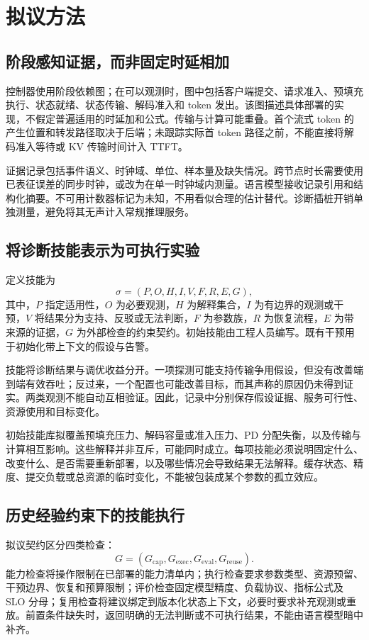 \documentclass[UTF8,11pt,a4paper,fontset=windows]{ctexart}
\begin{document}
\section{拟议方法}
\subsection{阶段感知证据，而非固定时延相加}
控制器使用阶段依赖图；在可以观测时，图中包括客户端提交、请求准入、预填充执行、状态就绪、状态传输、解码准入和 token 发出。该图描述具体部署的实现，不假定普遍适用的时延加和公式。传输与计算可能重叠。首个流式 token 的产生位置和转发路径取决于后端；未跟踪实际首 token 路径之前，不能直接将解码准入等待或 KV 传输时间计入 TTFT。

证据记录包括事件语义、时钟域、单位、样本量及缺失情况。跨节点时长需要使用已表征误差的同步时钟，或改为在单一时钟域内测量。语言模型接收记录引用和结构化摘要。不可用计数器标记为未知，不用看似合理的估计替代。诊断插桩开销单独测量，避免将其无声计入常规推理服务。

\subsection{将诊断技能表示为可执行实验}
定义技能为
\begin{equation}
 \sigma=(P,O,H,I,V,F,R,E,G),
\end{equation}
其中，$P$ 指定适用性，$O$ 为必要观测，$H$ 为解释集合，$I$ 为有边界的观测或干预，$V$ 将结果分为支持、反驳或无法判断，$F$ 为参数族，$R$ 为恢复流程，$E$ 为带来源的证据，$G$ 为外部检查的约束契约。初始技能由工程人员编写。既有干预用于初始化带上下文的假设与告警。

技能将诊断结果与调优收益分开。一项探测可能支持传输争用假设，但没有改善端到端有效吞吐；反过来，一个配置也可能改善目标，而其声称的原因仍未得到证实。两类观测不能自动互相验证。因此，记录中分别保存假设证据、服务可行性、资源使用和目标变化。

初始技能库拟覆盖预填充压力、解码容量或准入压力、PD 分配失衡，以及传输与计算相互影响。这些解释并非互斥，可能同时成立。每项技能必须说明固定什么、改变什么、是否需要重新部署，以及哪些情况会导致结果无法解释。缓存状态、精度、提交负载或总资源的临时变化，不能被包装成某个参数的孤立效应。

\subsection{历史经验约束下的技能执行}
拟议契约区分四类检查：
\begin{equation}
 G=(G_{\mathrm{cap}},G_{\mathrm{exec}},G_{\mathrm{eval}},G_{\mathrm{reuse}}).
\end{equation}
能力检查将操作限制在已部署的能力清单内；执行检查要求参数类型、资源预留、干预边界、恢复和预算限制；评价检查固定模型精度、负载协议、指标公式及 SLO 分母；复用检查将建议绑定到版本化状态上下文，必要时要求补充观测或重放。前置条件缺失时，返回明确的无法判断或不可执行结果，不能由语言模型暗中补齐。
\end{document}
